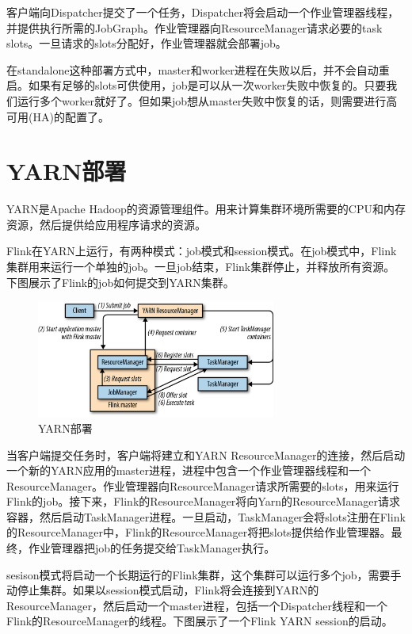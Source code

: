 \documentclass[cn,11pt,chinese]{elegantbook}
\begin{document}
客户端向Dispatcher提交了一个任务，Dispatcher将会启动一个作业管理器线程，并提供执行所需的JobGraph。作业管理器向ResourceManager请求必要的task slots。一旦请求的slots分配好，作业管理器就会部署job。

在standalone这种部署方式中，master和worker进程在失败以后，并不会自动重启。如果有足够的slots可供使用，job是可以从一次worker失败中恢复的。只要我们运行多个worker就好了。但如果job想从master失败中恢复的话，则需要进行高可用(HA)的配置了。

\section{YARN部署}

YARN是Apache Hadoop的资源管理组件。用来计算集群环境所需要的CPU和内存资源，然后提供给应用程序请求的资源。

Flink在YARN上运行，有两种模式：job模式和session模式。在job模式中，Flink集群用来运行一个单独的job。一旦job结束，Flink集群停止，并释放所有资源。下图展示了Flink的job如何提交到YARN集群。

\begin{figure}[htbp]
    \centering
    \includegraphics[width=0.7\textwidth]{images/spaf_0903.png}
    \caption{YARN部署}
\end{figure}

当客户端提交任务时，客户端将建立和YARN ResourceManager的连接，然后启动一个新的YARN应用的master进程，进程中包含一个作业管理器线程和一个ResourceManager。作业管理器向ResourceManager请求所需要的slots，用来运行Flink的job。接下来，Flink的ResourceManager将向Yarn的ResourceManager请求容器，然后启动TaskManager进程。一旦启动，TaskManager会将slots注册在Flink的ResourceManager中，Flink的ResourceManager将把slots提供给作业管理器。最终，作业管理器把job的任务提交给TaskManager执行。

sesison模式将启动一个长期运行的Flink集群，这个集群可以运行多个job，需要手动停止集群。如果以session模式启动，Flink将会连接到YARN的ResourceManager，然后启动一个master进程，包括一个Dispatcher线程和一个Flink的ResourceManager的线程。下图展示了一个Flink YARN session的启动。
\end{document}
